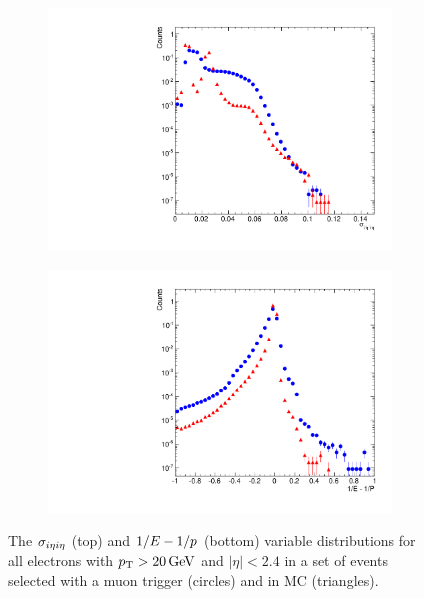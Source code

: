 \begin{figure}[!htbp]
    \centering
    \begin{subfigure}[b]{0.65\textwidth}
        \includegraphics[width=\textwidth]{figures/sigma_ieta_ieta.pdf}
        \caption{}
        \label{fig:sieie}
    \end{subfigure}
    \begin{subfigure}[b]{0.65\textwidth}
        \includegraphics[width=\textwidth]{figures/1oe_1op.pdf}
        \caption{}
        \label{fig:ooeoop}
    \end{subfigure}
    \caption[
        Distributions of $\sigmaietaieta$ and $\ooeoop$ in data and MC.
    ]{
        The $\sigmaietaieta$ (top) and $\ooeoop$ (bottom) variable
        distributions for all electrons with $p_{\mathrm{T}} > 20 \,\text{Ge\hspace{-.08em}V}$ and $|\eta| < 2.4$
        in a set of events selected with a muon trigger (circles) and in
        \MADGRAPH \Ztoee MC (triangles).
    }
    \label{fig:sieie_ooeoop}
\end{figure}

